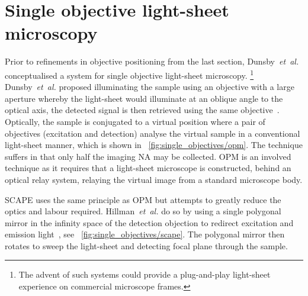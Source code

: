 \section{Single objective \gls{light-sheet} microscopy}


Prior to refinements in objective positioning from the last section, Dunsby~\emph{et~al.} conceptualised a system for single objective \gls{light-sheet} microscopy.
\footnote{The advent of such systems could provide a plug-and-play \gls{light-sheet} experience on commercial microscope frames.}
Dunsby~\emph{et~al.} proposed illuminating the sample using an objective with a large aperture whereby the \gls{light-sheet} would illuminate at an oblique angle to the optical axis, the detected signal is then retrieved using the same objective~\cite{dunsby_optically_2008}.
Optically, the sample is conjugated to a virtual position where a pair of objectives (excitation and detection) analyse the virtual sample in a conventional \gls{light-sheet} manner, which is shown in \figurename~\ref{fig:single_objectives/opm}.
The technique suffers in that only half the imaging \gls{NA} may be collected.
\gls{OPM} is an involved technique as it requires that a \gls{light-sheet} microscope is constructed, behind an optical relay system, relaying the virtual image from a standard microscope body.

\gls{SCAPE} uses the same principle as \gls{OPM} but attempts to greatly reduce the optics and labour required.
Hillman~\emph{et~al.} do so by using a single polygonal mirror in the infinity space of the detection objection to redirect excitation and emission light~\cite{bouchardSweptConfocallyalignedPlanar2015}, see \figurename~\ref{fig:single_objectives/scape}.
The polygonal mirror then rotates to sweep the light-sheet and detecting focal plane through the sample.

